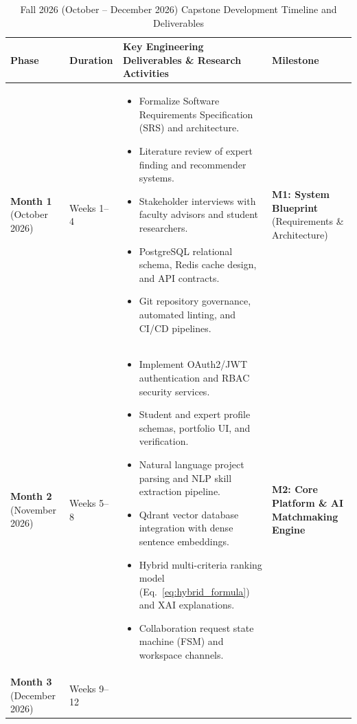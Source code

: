 \documentclass[11pt,a4paper]{article}
\begin{document}
\begin{table}[H]
\centering
\small
\caption{Fall 2026 (October -- December 2026) Capstone Development Timeline and Deliverables}
\label{tab:gantt_table}
\begin{tabularx}{\textwidth}{@{}p{2.5cm} p{1.8cm} X p{3.4cm}@{}}
\toprule
\textbf{Phase} & \textbf{Duration} & \textbf{Key Engineering Deliverables \& Research Activities} & \textbf{Milestone} \\
\midrule
\textbf{Month 1} \newline (October 2026) & Weeks 1--4 & 
\begin{itemize}[leftmargin=*,noitemsep]
    \item Formalize Software Requirements Specification (SRS) and architecture.
    \item Literature review of expert finding and recommender systems.
    \item Stakeholder interviews with faculty advisors and student researchers.
    \item PostgreSQL relational schema, Redis cache design, and API contracts.
    \item Git repository governance, automated linting, and CI/CD pipelines.
\end{itemize} & \textbf{M1: System Blueprint} \newline (Requirements \& Architecture) \\
\addlinespace
\textbf{Month 2} \newline (November 2026) & Weeks 5--8 & 
\begin{itemize}[leftmargin=*,noitemsep]
    \item Implement OAuth2/JWT authentication and RBAC security services.
    \item Student and expert profile schemas, portfolio UI, and verification.
    \item Natural language project parsing and NLP skill extraction pipeline.
    \item Qdrant vector database integration with dense sentence embeddings.
    \item Hybrid multi-criteria ranking model (Eq.~\ref{eq:hybrid_formula}) and XAI explanations.
    \item Collaboration request state machine (FSM) and workspace channels.
\end{itemize} & \textbf{M2: Core Platform \& AI Matchmaking Engine} \\
\addlinespace
\textbf{Month 3} \newline (December 2026) & Weeks 9--12 & 

\end{tabularx}
\end{table}
\end{document}
